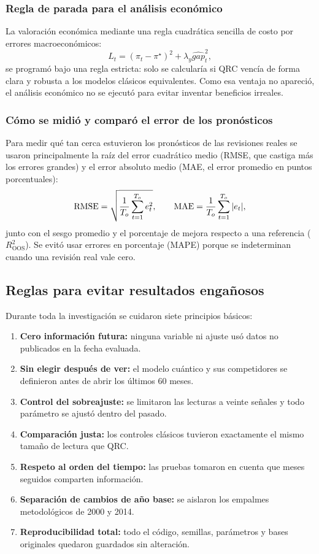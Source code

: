 \subsubsection{Regla de parada para el análisis económico}

La valoración económica mediante una regla cuadrática sencilla de costo por errores macroeconómicos:
\begin{equation}
	L_t=(\pi_t-\pi^\star)^2+\lambda_y \widehat{gap}_t^2,
	\label{eq:loss}
\end{equation}
se programó bajo una regla estricta: solo se calcularía si QRC vencía de forma clara y robusta a los modelos clásicos equivalentes. Como esa ventaja no apareció, el análisis económico no se ejecutó para evitar inventar beneficios irreales.

\subsubsection{Cómo se midió y comparó el error de los pronósticos}

Para medir qué tan cerca estuvieron los pronósticos de las revisiones reales se usaron principalmente la raíz del error cuadrático medio (RMSE, que castiga más los errores grandes) y el error absoluto medio (MAE, el error promedio en puntos porcentuales):
\[
\text{RMSE}=\sqrt{\frac{1}{T_o}\sum_{t=1}^{T_o}e_t^2},
\qquad
\text{MAE}=\frac{1}{T_o}\sum_{t=1}^{T_o}|e_t|,
\]
junto con el sesgo promedio y el porcentaje de mejora respecto a una referencia (\(R^2_{\text{OOS}}\)). Se evitó usar errores en porcentaje (MAPE) porque se indeterminan cuando una revisión real vale cero.

\subsection{Reglas para evitar resultados engañosos}

Durante toda la investigación se cuidaron siete principios básicos:
\begin{enumerate}
	\item \textbf{Cero información futura:} ninguna variable ni ajuste usó datos no publicados en la fecha evaluada.
	\item \textbf{Sin elegir después de ver:} el modelo cuántico y sus competidores se definieron antes de abrir los últimos \(60\) meses.
	\item \textbf{Control del sobreajuste:} se limitaron las lecturas a veinte señales y todo parámetro se ajustó dentro del pasado.
	\item \textbf{Comparación justa:} los controles clásicos tuvieron exactamente el mismo tamaño de lectura que QRC.
	\item \textbf{Respeto al orden del tiempo:} las pruebas tomaron en cuenta que meses seguidos comparten información.
	\item \textbf{Separación de cambios de año base:} se aislaron los empalmes metodológicos de 2000 y 2014.
	\item \textbf{Reproducibilidad total:} todo el código, semillas, parámetros y bases originales quedaron guardados sin alteración.
\end{enumerate}

